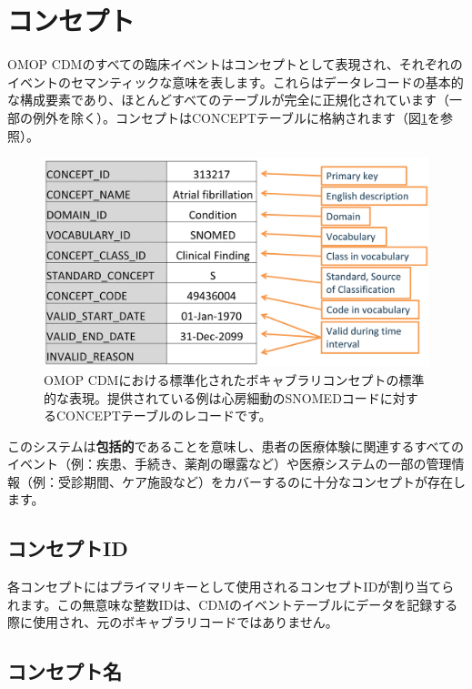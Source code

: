 \documentclass[
  11pt]{book}
\theoremstyle{definition}
\theoremstyle{definition}
\theoremstyle{definition}
\theoremstyle{definition}
\theoremstyle{remark}
\begin{document}
\section{コンセプト}\label{ux30b3ux30f3ux30bbux30d7ux30c8}

OMOP CDMのすべての臨床イベントはコンセプトとして表現され、それぞれのイベントのセマンティックな意味を表します。これらはデータレコードの基本的な構成要素であり、ほとんどすべてのテーブルが完全に正規化されています（一部の例外を除く）。コンセプトはCONCEPTテーブルに格納されます（図\ref{fig:concept}を参照）。

\begin{figure}

{\centering \includegraphics[width=0.9\linewidth]{images/StandardizedVocabularies/concept} 

}

\caption{OMOP CDMにおける標準化されたボキャブラリコンセプトの標準的な表現。提供されている例は心房細動のSNOMEDコードに対するCONCEPTテーブルのレコードです。}\label{fig:concept}
\end{figure}

このシステムは\textbf{包括的}であることを意味し、患者の医療体験に関連するすべてのイベント（例：疾患、手続き、薬剤の曝露など）や医療システムの一部の管理情報（例：受診期間、ケア施設など）をカバーするのに十分なコンセプトが存在します。

\subsection{コンセプトID}\label{ux30b3ux30f3ux30bbux30d7ux30c8id}

各コンセプトにはプライマリキーとして使用されるコンセプトIDが割り当てられます。この無意味な整数IDは、CDMのイベントテーブルにデータを記録する際に使用され、元のボキャブラリコードではありません。 

\subsection{コンセプト名}\label{ux30b3ux30f3ux30bbux30d7ux30c8ux540d}
\end{document}
